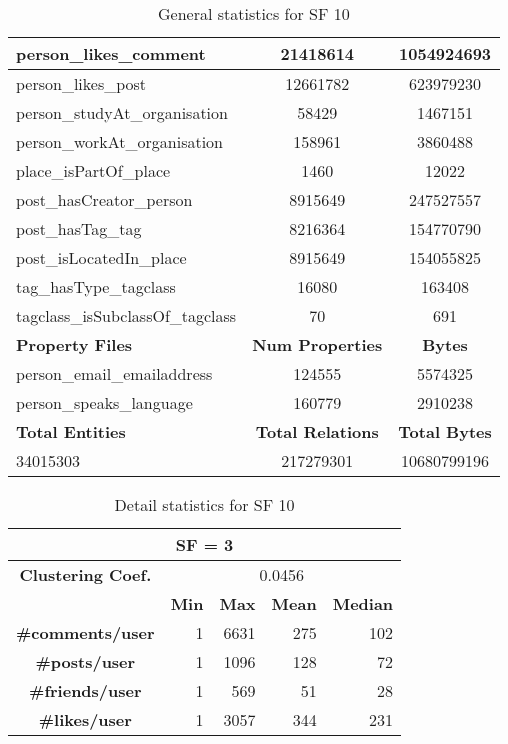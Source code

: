 \begin{table}[H]
\begin{tabular} {| l | c | c |}
        \hline
        person\_likes\_comment & 21418614 & 1054924693 \\
        \hline
        person\_likes\_post & 12661782 & 623979230 \\
        \hline
        person\_studyAt\_organisation & 58429 & 1467151 \\
        \hline
        person\_workAt\_organisation & 158961 & 3860488 \\
        \hline
        place\_isPartOf\_place & 1460 & 12022 \\
        \hline
        post\_hasCreator\_person & 8915649 & 247527557 \\
        \hline
        post\_hasTag\_tag & 8216364 & 154770790 \\
        \hline
        post\_isLocatedIn\_place & 8915649 & 154055825 \\
        \hline
        tag\_hasType\_tagclass & 16080 & 163408 \\
        \hline
        tagclass\_isSubclassOf\_tagclass & 70 & 691 \\
        \hline
        \hline
        \textbf{Property Files} & \textbf{Num Properties} & \textbf{Bytes} \\
        \hline
        \hline
        person\_email\_emailaddress & 124555 & 5574325 \\
        \hline
        person\_speaks\_language & 160779 & 2910238 \\
        \hline
        \hline
        \textbf{Total Entities} & \textbf{Total Relations} & \textbf{Total Bytes} \\
        \hline
        \hline
         34015303 & 217279301 & 10680799196 \\
        \hline
    \end{tabular}
    \caption{General statistics for SF 10}
\end{table}

\begin{table}[H]
\centering
\begin{tabular}{|c||r|r|r|r|}
\hline    \multicolumn{5}{|c|}{SF = 3 }  \\
\hline   \textbf{Clustering Coef.} &   \multicolumn{4}{|c|}{0.0456} \\
\hline & \textbf{Min} & \textbf{Max} & \textbf{Mean} & \textbf{Median}   \\
\hline  \textbf{\#comments/user}  &1 &  6631 & 275 & 102 \\
\hline  \textbf{\#posts/user}  &1 &  1096 & 128 & 72 \\
\hline  \textbf{\#friends/user}  &1 &  569 & 51 & 28 \\
\hline  \textbf{\#likes/user}  &1 &  3057 & 344 & 231 \\
\hline
\end{tabular}
\caption{Detail statistics for SF 10}
\end{table}


